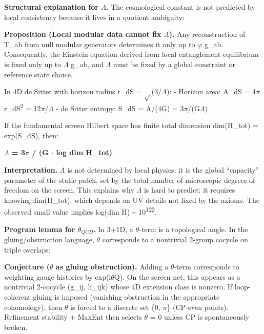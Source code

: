 \documentclass[11pt,a4paper]{article}
\theoremstyle{remark}
\begin{document}
\textbf{Structural explanation for \ensuremath{\Lambda}.} The cosmological constant is not predicted by local consistency because it lives in a quotient ambiguity:

\textbf{Proposition (Local modular data cannot fix \ensuremath{\Lambda}).} Any reconstruction of T\_ab from null modular generators determines it only up to \ensuremath{\varphi} g\_ab. Consequently, the Einstein equation derived from local entanglement equilibrium is fixed only up to \ensuremath{\Lambda} g\_ab, and \ensuremath{\Lambda} must be fixed by a global constraint or reference state choice.

In 4D de Sitter with horizon radius r\_dS = \ensuremath{\sqrt{}}(3/\ensuremath{\Lambda}):
- Horizon area: A\_dS = 4\ensuremath{\pi} r\_dS\textsuperscript{2} = 12\ensuremath{\pi}/\ensuremath{\Lambda}
- de Sitter entropy: S\_dS = A/(4G) = 3\ensuremath{\pi}/(G\ensuremath{\Lambda})

If the fundamental screen Hilbert space has finite total dimension dim(H\_tot) = exp(S\_dS), then:

\textbf{\ensuremath{\Lambda} = 3\ensuremath{\pi} / (G \ensuremath{\cdot} log dim H\_tot)}

\textbf{Interpretation.} \ensuremath{\Lambda} is not determined by local physics; it is the global ``capacity'' parameter of the static patch, set by the total number of microscopic degrees of freedom on the screen. This explains why \ensuremath{\Lambda} is hard to predict: it requires knowing dim(H\_tot), which depends on UV details not fixed by the axioms. The observed small value implies log(dim H) \textasciitilde{} 10\textsuperscript{122}.

\textbf{Program lemma for $\theta_{QCD}$.} In 3+1D, a \ensuremath{\theta}-term is a topological angle. In the gluing/obstruction language, \ensuremath{\theta} corresponds to a nontrivial 2-group cocycle on triple overlaps:

\textbf{Conjecture (\ensuremath{\theta} as gluing obstruction).} Adding a \ensuremath{\theta}-term corresponds to weighting gauge histories by exp(i\ensuremath{\theta}Q). On the screen net, this appears as a nontrivial 2-cocycle (g\_ij, h\_ijk) whose 4D extension class is nonzero. If loop-coherent gluing is imposed (vanishing obstruction in the appropriate cohomology), then \ensuremath{\theta} is forced to a discrete set \{0, \ensuremath{\pi}\} (CP-even points). Refinement stability + MaxEnt then selects \ensuremath{\theta} = 0 unless CP is spontaneously broken.
\end{document}

